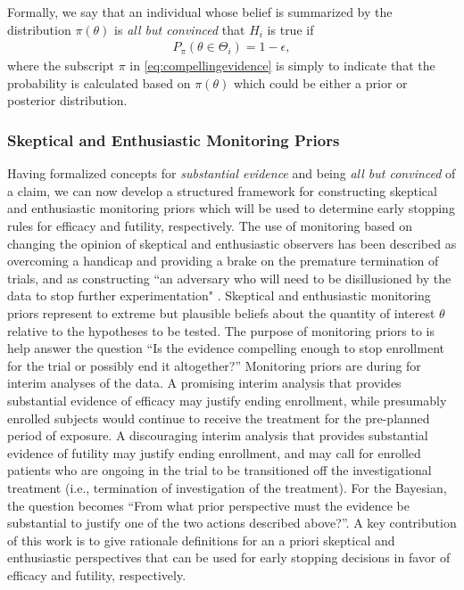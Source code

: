 \documentclass[12pt]{article}
\begin{document}
Formally, we say that an individual whose belief is summarized by the distribution $\pi\left(\theta\right)$ is \textit{all but convinced} that $H_i$ is true if 
\begin{align}\label{eq:compellingevidence}
		P_\pi(\theta\in\Theta_i)= 1-\epsilon,
\end{align} 
where the subscript $\pi$ in \eqref{eq:compellingevidence} is simply to indicate that the probability is calculated based on $\pi\left(\theta\right)$ which could be either a prior
or posterior distribution.

\subsubsection{Skeptical and Enthusiastic Monitoring Priors}\label{sec:MP}
Having formalized concepts for \textit{substantial evidence} and  being \textit{all but convinced} of a claim, 
we can now develop a structured framework for constructing skeptical and enthusiastic monitoring priors which will be used to 
determine early stopping rules for efficacy and futility, respectively.
%
The use of monitoring based on changing the opinion of skeptical and enthusiastic observers has been described as overcoming a 
handicap \citep{Freedman1989} and providing a brake \citep{Fayers1997} on the premature termination of trials, and as 
constructing ``an adversary who will need to be disillusioned by the data to stop further experimentation" \citep{Spiegelhalter1994}. 
%
Skeptical and enthusiastic monitoring priors represent to extreme but plausible beliefs about the quantity of interest $\theta$ relative to the hypotheses to be tested.
%
The purpose of monitoring priors to is help answer the question ``Is the evidence compelling enough to stop enrollment for the trial or possibly end it altogether?''
%
Monitoring priors are during for interim analyses of the data. 
A promising interim analysis that provides substantial evidence of efficacy may justify ending enrollment, while presumably enrolled subjects would continue 
to receive the treatment for the pre-planned period of exposure. 
%
A discouraging interim analysis that provides substantial evidence of futility may justify ending enrollment, and may call for enrolled patients 
who are ongoing in the trial to be transitioned off the investigational treatment (i.e., termination of investigation of the treatment). 
%
For the Bayesian, the question becomes ``From what prior perspective must the evidence be substantial to justify one of the two actions described above?''.
%
A key contribution of this work is to give rationale definitions for an a priori skeptical and enthusiastic perspectives that can be used for early stopping decisions 
in favor of efficacy and futility, respectively.
\end{document}
